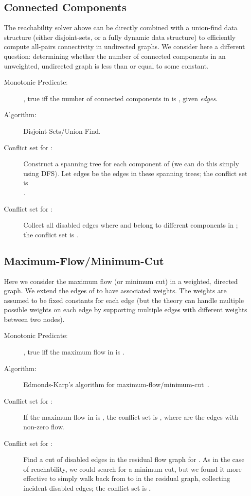 \documentclass[runningheads]{llncs}
\begin{document}
\subsection{{Connected Components}}
The reachability solver above can be directly combined with a union-find data structure (either disjoint-sets, or a fully dynamic data structure\cite{holm2001poly}) to efficiently compute all-pairs connectivity in undirected graphs. We consider here a different question: determining whether the number of connected components in an unweighted, undirected graph is less than or equal to some constant. 

\begin{description}
\item[Monotonic Predicate:] , true iff the number of connected components in  is , given \textit{edges}. 
\item[Algorithm:] Disjoint-Sets/Union-Find.
\item[Conflict set for :]  Construct a spanning tree for each component of  (we can do this simply using DFS). Let edges  be the edges in these spanning trees; the conflict set is\\ .
\item[Conflict set for :] Collect all disabled edges  where  and  belong to different components in ;
the conflict set is .

\end{description}

\subsection{{Maximum-Flow/Minimum-Cut}}
Here we consider the maximum  flow (or minimum
 cut) in a weighted, directed graph. We extend the edges of  to have associated weights. The
weights are assumed to be fixed constants for each edge (but the theory
can handle multiple possible weights on each edge by
supporting multiple edges with different weights between two nodes).

\begin{description}
\item[Monotonic Predicate:] , true iff the maximum  flow in  is .
\item[Algorithm:] Edmonds-Karp's algorithm for maximum-flow/minimum-cut~\cite{edmonds1972theoretical}.
\item[Conflict set for :]  If the maximum flow
in  is ,
the conflict set is , where  are the edges with non-zero flow.
\item[Conflict set for :] Find a cut
 of disabled edges in the residual  flow graph
for . As in the case of reachability, we could search for a
minimum cut, but we found it more effective to simply walk back
from  to  in the residual graph, collecting incident disabled edges;
the conflict set is .
\end{description}
\end{document}
